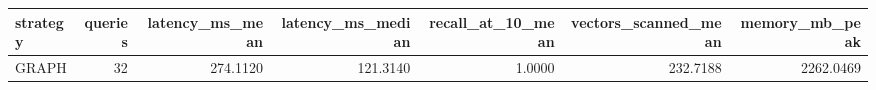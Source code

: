 \begin{tabular}{lrrrrrr}
\toprule
strategy & queries & latency_ms_mean & latency_ms_median & recall_at_10_mean & vectors_scanned_mean & memory_mb_peak \\
\midrule
GRAPH & 32 & 274.1120 & 121.3140 & 1.0000 & 232.7188 & 2262.0469 \\
\bottomrule
\end{tabular}
